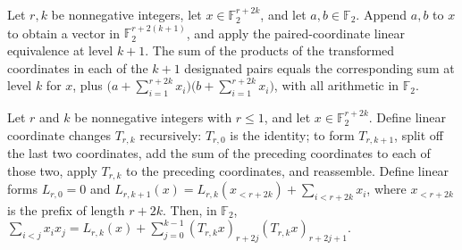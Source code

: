\begin{theorem}
\label{FABL.pairedProductSum_succ_appendTwo}
\leanok
{}
Let $r,k$ be nonnegative integers, let $x\in\mathbb F_2^{r+2k}$, and let $a,b\in\mathbb
F_2$. Append $a,b$ to $x$ to obtain a vector in $\mathbb F_2^{r+2(k+1)}$, and apply the
paired-coordinate linear equivalence at level $k+1$. The sum of the products of the
transformed coordinates in each of the $k+1$ designated pairs equals the corresponding
sum at level $k$ for $x$, plus
$\bigl(a+\sum_{i=1}^{r+2k}x_i\bigr)\bigl(b+\sum_{i=1}^{r+2k}x_i\bigr)$, with all
arithmetic in $\mathbb F_2$.
\end{theorem}

\begin{theorem}
\label{FABL.completeQuadraticBit_paired_decomposition}
\leanok
{}
Let $r$ and $k$ be nonnegative integers with $r\le 1$, and let
$x\in\mathbb{F}_2^{r+2k}$. Define linear coordinate changes $T_{r,k}$ recursively:
$T_{r,0}$ is the identity; to form $T_{r,k+1}$, split off the last two coordinates, add
the sum of the preceding coordinates to each of those two, apply $T_{r,k}$ to the
preceding coordinates, and reassemble. Define linear forms $L_{r,0}=0$ and
$L_{r,k+1}(x)=L_{r,k}(x_{<r+2k})+\sum_{i<r+2k}x_i$, where $x_{<r+2k}$ is the prefix of
length $r+2k$. Then, in $\mathbb{F}_2$, $\sum_{i<j}x_i
x_j=L_{r,k}(x)+\sum_{j=0}^{k-1}(T_{r,k}x)_{r+2j}(T_{r,k}x)_{r+2j+1}$.
\end{theorem}

